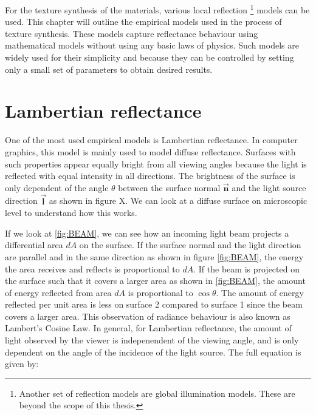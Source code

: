 \hypertarget{empiricalModels}{
}


\noindent For the texture synthesis of the materials, various local reflection \footnote[1]{Another set of reflection models are global illumination models. These are beyond the scope of this thesis.} models can be used. This chapter will outline the empirical models used in the process of texture synthesis. These models capture reflectance behaviour using mathematical models without using any basic laws of physics. Such models are widely used for their simplicity and because they can be controlled by setting only a small set of parameters to obtain desired results.

\section{Lambertian reflectance}\label{Lambertian}
	One of the most used empirical models is Lambertian reflectance. In computer graphics, this model is mainly used to model diffuse reflectance. Surfaces with such properties appear equally bright from all viewing angles because the light is reflected with equal intensity in all directions. The brightness of the surface is only dependent of the angle $\theta$ between the surface normal $\vec{\mathbf{n}}$ and the light source direction $\vec{\mathbf{l}}$ as shown in figure X. We can look at a diffuse surface on microscopic level to understand how this works. 

If we look at \ref{fig:BEAM}, we can see how an incoming light beam projects a differential area $dA$ on the surface. If the surface normal and the light direction are parallel and in the same direction as shown in figure \ref{fig:BEAM}, the energy the area receives and reflects is proportional to $dA$. If the beam is projected on the surface such that it covers a larger area as shown in \ref{fig:BEAM}, the amount of energy reflected from area $dA$ is proportional to $\cos \theta$. The amount of energy reflected per unit area is less on surface 2 compared to surface 1 since the beam covers a larger area. This observation of radiance behaviour is also known as Lambert's Cosine Law. In general, for Lambertian reflectance, the amount of light observed by the viewer is indepenendent of the viewing angle, and is only dependent on the angle of the incidence of the light source. The full equation is given by:

